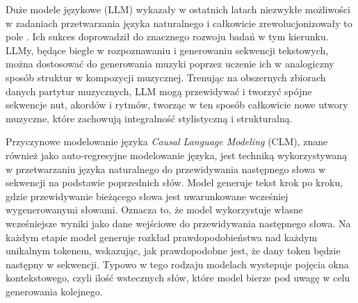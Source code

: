 \documentclass[data-science]{agh-wi} %
\begin{document}
Duże modele językowe (LLM) wykazały w ostatnich latach niezwykłe możliwości w zadaniach przetwarzania języka naturalnego i całkowicie zrewolucjonizowały to pole \cite{adiwardana2020humanlike, end_of_nlp}. Ich sukces doprowadził do znacznego rozwoju badań w tym kierunku. LLMy, będące biegłe w rozpoznawaniu i generowaniu sekwencji tekstowych, można dostosować do generowania muzyki poprzez uczenie ich w analogiczny sposób struktur w kompozycji muzycznej. Trenując na obszernych zbiorach danych partytur muzycznych, LLM mogą przewidywać i tworzyć spójne sekwencje nut, akordów i rytmów, tworząc w ten sposób całkowicie nowe utwory muzyczne, które zachowują integralność stylistyczną i strukturalną.

Przyczynowe modelowanie języka \textit{Causal Language Modeling} (CLM), znane również jako auto-regresyjne modelowanie języka, jest techniką wykorzystywaną w przetwarzaniu języka naturalnego do przewidywania następnego słowa w sekwencji na podstawie poprzednich słów. Model generuje tekst krok po kroku, gdzie przewidywanie bieżącego słowa jest uwarunkowane wcześniej wygenerowanymi słowami. Oznacza to, że model wykorzystuje własne wcześniejsze wyniki jako dane wejściowe do przewidywania następnego słowa. Na każdym etapie model generuje rozkład prawdopodobieństwa nad każdym unikalnym tokenem, wskazując, jak prawdopodobne jest, że dany token będzie następny w sekwencji. Typowo w tego rodzaju modelach wystepuje pojęcia okna kontekstowego, czyli ilość wstecznych słów, które model bierze pod uwagę w celu generowania kolejnego.
\end{document}
